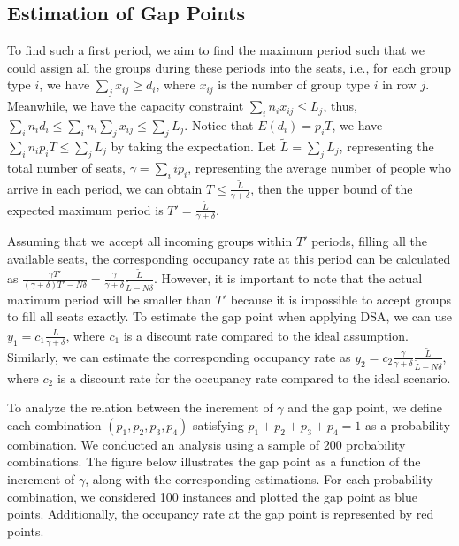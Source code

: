 \subsection{Estimation of Gap Points}
To find such a first period, we aim to find the maximum period such that we could assign all the groups during these periods into the seats, i.e., for each group type $i$, we have $\sum_{j} x_{ij} \geq d_i$, where $x_{ij}$ is the number of group type $i$ in row $j$. Meanwhile, we have the capacity constraint $\sum_{i} n_{i} x_{ij} \leq L_j$, thus, $\sum_{i} n_i d_i \leq \sum_{i} n_i \sum_{j} x_{ij} \leq \sum_{j} L_{j}$. Notice that $E(d_i) = p_i T$, we have $\sum_{i} n_i p_i T \leq \sum_{j} L_{j}$ by taking the expectation. Let $\tilde{L} = \sum_{j} L_{j}$, representing the total number of seats, $\gamma = \sum_{i} i p_i$, representing the average number of people who arrive in each period, we can obtain $T \leq \frac{\tilde{L}}{\gamma + \delta}$, then the upper bound of the expected maximum period is $T' = \frac{\tilde{L}}{\gamma + \delta}$.


Assuming that we accept all incoming groups within $T'$ periods, filling all the available seats, the corresponding occupancy rate at this period can be calculated as $\frac{\gamma T'}{(\gamma+ \delta)T' - N \delta} = \frac{\gamma}{\gamma +\delta} \frac{\tilde{L}}{\tilde{L}-N \delta}$. However, it is important to note that the actual maximum period will be smaller than $T{'}$ because it is impossible to accept groups to fill all seats exactly. To estimate the gap point when applying DSA, we can use $y_1 = c_1 \frac{\tilde{L}}{\gamma + \delta}$, where $c_1$ is a discount rate compared to the ideal assumption. Similarly, we can estimate the corresponding occupancy rate as $y_2 = c_2 \frac{\gamma}{\gamma +\delta} \frac{\tilde{L}}{\tilde{L}-N \delta}$, where $c_2$ is a discount rate for the occupancy rate compared to the ideal scenario.

To analyze the relation between the increment of $\gamma$ and the gap point, we define each combination $(p_1, p_2, p_3, p_4)$ satisfying $p_1 + p_2 + p_3 + p_4 = 1$ as a probability combination. We conducted an analysis using a sample of 200 probability combinations. The figure below illustrates the gap point as a function of the increment of $\gamma$, along with the corresponding estimations. For each probability combination, we considered 100 instances and plotted the gap point as blue points. Additionally, the occupancy rate at the gap point is represented by red points.


